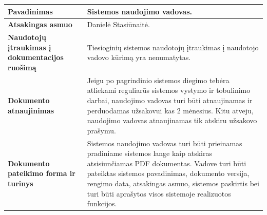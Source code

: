 \documentclass[12pt]{article}
\begin{document}
\begin{table}[htb!]
    \captionsetup{justification=centering}
    \begin{tabular}{|m{6cm}|m{10cm}|}
        \hline
        \raggedleft \textbf{\cellcolor{deepchampagne}Pavadinimas} &
        Sistemos naudojimo vadovas. \\
        \hline
        \raggedleft \textbf{\cellcolor{deepchampagne}Atsakingas asmuo} &
        Danielė Stasiūnaitė. \\
        \hline
        \raggedleft \textbf{\cellcolor{deepchampagne}Naudotojų įtraukimas į
        dokumentacijos ruošimą} & 
        Tiesioginių sistemos naudotojų įtraukimas į naudotojo vadovo kūrimą yra
        nenumatytas. \\
        \hline
        \raggedleft \textbf{\cellcolor{deepchampagne}Dokumento atnaujinimas} &
        Jeigu po pagrindinio sistemos diegimo tebėra atliekami reguliarūs
        sistemos vystymo ir tobulinimo darbai, naudojimo vadovas turi būti
        atnaujinamas ir perduodamas užsakovui kas 2 mėnesius. Kitu atveju,
        naudojimo vadovas atnaujinamas tik atskiru užsakovo prašymu. \\
        \hline
        \raggedleft \textbf{\cellcolor{deepchampagne}Dokumento pateikimo forma
        ir turinys} &
        Sistemos naudojimo vadovas turi būti prieinamas pradiniame sistemos
        lange kaip atskiras atsisiunčiamas PDF dokumentas. Vadove turi būti
        pateiktas sistemos pavadinimas, dokumento versija, rengimo data,
        atsakingas asmuo, sistemos paskirtis bei turi būti aprašytos visos
        sistemoje realizuotos funkcijos. \\
        \hline
    \end{tabular}
\end{table}

\end{document}
